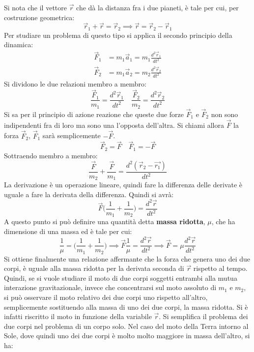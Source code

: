 \documentclass[10pt,a4paper]{book}
\begin{document}
\begin{figure}[htpb]
\end{figure}
\FloatBarrier
Si nota che il vettore $\vec{r}$ che dà la distanza fra i due pianeti, è tale per cui, per costruzione geometrica:
\[
	\vec{r}_1+\vec{r}=\vec{r}_2 \implies \vec{r}=\vec{r}_2-\vec{r}_1
\]
Per studiare un problema di questo tipo si applica il secondo principio della dinamica:
\begin{align*}
	\vec{F}_1 &= m_1\vec{a}_1=m_1\frac{d^2\vec{r}_1}{dt^2} \\
	\vec{F}_2 &= m_1\vec{a}_2=m_2\frac{d^2\vec{r}_2}{dt^2}
\end{align*}
Si dividono le due relazioni membro a membro:
\[
	\frac{\vec{F}_1}{m_1}=\frac{d^2\vec{r}_1}{dt^2} \quad \frac{\vec{F}_2}{m_2}=\frac{d^2\vec{r}_2}{dt^2}
\]
Si sa per il principio di azione reazione che queste due forze $\vec{F}_1$ e $\vec{F}_2$ non sono indipendenti fra di loro ma sono una l'opposta dell'altra. Si chiami allora $\vec{F}$ la forza $\vec{F}_2$, $\vec{F}_1$ sarà semplicemente $-\vec{F}$.
\[
	\vec{F}_2=\vec{F} \quad \vec{F}_1=-\vec{F}
\]
Sottraendo membro a membro:
\[
	\frac{\vec{F}}{m_2}+\frac{\vec{F}}{m_1}=\frac{d^2(\vec{r}_2-\vec{r_1})}{dt^2}
\]
La derivazione è un operazione lineare, quindi fare la differenza delle derivate è uguale a fare la derivata della differenza. Quindi si avrà:
\[
	\vec{F} \biggl(\frac{1}{m_1}+\frac{1}{m_2} \biggr)=\frac{d^2\vec{r}}{dt^2}
\]
A questo punto si può definire una quantità detta \textbf{massa ridotta}, $\mu$, che ha dimensione di una massa ed è tale per cui:
\[
	\frac{1}{\mu}=\biggl(\frac{1}{m_1}+\frac{1}{m_2} \biggr) \implies \vec{F}\frac{1}{\mu}=\frac{d^2\vec{r}}{dt^2} \implies \vec{F}=\mu \frac{d^2\vec{r}}{dt^2}
\]
Si ottiene finalmente una relazione affermante che la forza che genera uno dei due corpi, è uguale alla massa ridotta per la derivata seconda di $\vec{r}$ rispetto al tempo. Quindi, se si vuole studiare il moto di due corpi soggetti entrambi alla mutua interazione gravitazionale, invece che concentrarsi sul moto assoluto di $m_1$ e $m_2$, si può osservare il moto relativo dei due corpi uno rispetto all'altro, semplicemente sostituendo alla massa di uno dei due corpi, la massa ridotta. Si è infatti riscritto il moto in funzione della variabile $\vec{r}$.  Si semplifica il problema dei due corpi nel problema di un corpo solo. Nel caso del moto della Terra intorno al Sole, dove quindi uno dei due corpi è molto molto maggiore in massa dell'altro, si ha:
\end{document}
